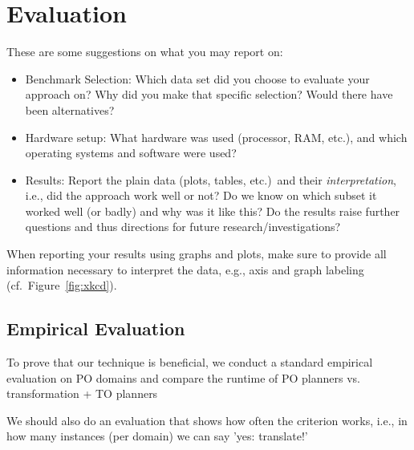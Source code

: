 \chapter{Evaluation}\label{chap:evaluation}


These are some suggestions on what you may report on:
\begin{itemize}
  \item Benchmark Selection: Which data set did you choose to evaluate your approach on? Why did you make that specific selection? Would there have been alternatives?
  \item Hardware setup: What hardware was used (processor, RAM, etc.), and which operating systems and software were used?
  \item Results: Report the plain data (plots, tables, etc.)\ and their \emph{interpretation}, i.e., did the approach work well or not? Do we know on which subset it worked well (or badly) and why was it like this? Do the results raise further questions and thus directions for future research/investigations?
\end{itemize}

When reporting your results using graphs and plots, make sure to provide all information necessary to interpret the data, e.g., axis and graph labeling (cf.~Figure~\ref{fig:xkcd}).


\section{Empirical Evaluation}
To prove that our technique is beneficial, we conduct a standard empirical evaluation on PO domains and compare the runtime of PO planners vs. transformation + TO planners

We should also do an evaluation that shows how often the criterion works, i.e., in how many instances (per domain) we can say 'yes: translate!'



